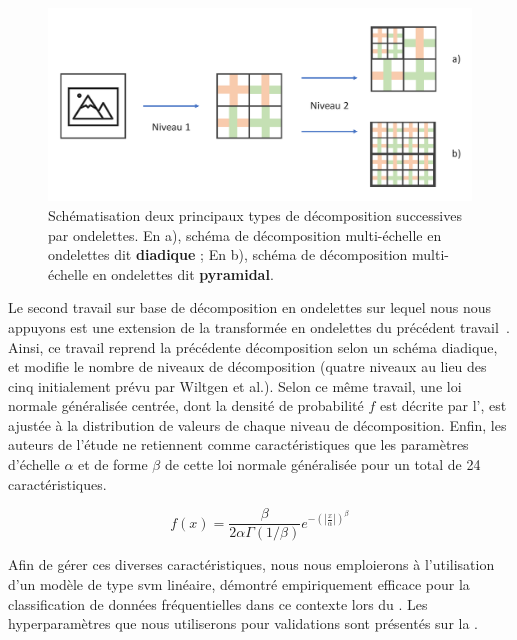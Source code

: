 \begin{figure}[H]
    \centering
    \includegraphics[width=\textwidth]{contents/chapter_5/resources/scheme_dwt_decomposition.pdf}
    \caption{Schématisation deux principaux types de décomposition successives par ondelettes. En a), schéma de décomposition multi-échelle en ondelettes dit \textbf{diadique} ; En b), schéma de décomposition multi-échelle en ondelettes dit \textbf{pyramidal}.}
    \label{fig:scheme_dwt_decomposition}
\end{figure}\par

Le second travail sur base de décomposition en ondelettes sur lequel nous nous appuyons est une extension de la transformée en ondelettes du précédent travail~\cite{Halimi2017a}. Ainsi, ce travail reprend la précédente décomposition selon un schéma diadique, et modifie le nombre de niveaux de décomposition (quatre niveaux au lieu des cinq initialement prévu par Wiltgen et al.). Selon ce même travail, une loi normale généralisée centrée, dont la densité de probabilité $f$ est décrite par l', est ajustée à la distribution de valeurs de chaque niveau de décomposition. Enfin, les auteurs de l'étude ne retiennent comme caractéristiques que les paramètres d'échelle $\alpha$ et de forme $\beta$ de cette loi normale généralisée pour un total de 24 caractéristiques.\par

\begin{equation}
    f(x)= \frac{\beta}{2\alpha\Gamma(1/\beta)} e^{-\left(|\frac{x}{\alpha}|\right)^\beta}
    \label{eq:ggd}
\end{equation}

Afin de gérer ces diverses caractéristiques, nous nous emploierons à l'utilisation d'un modèle de type \gls{svm} linéaire, démontré empiriquement efficace pour la classification de données fréquentielles dans ce contexte lors du . Les hyperparamètres que nous utiliserons pour validations sont présentés sur la .\par

